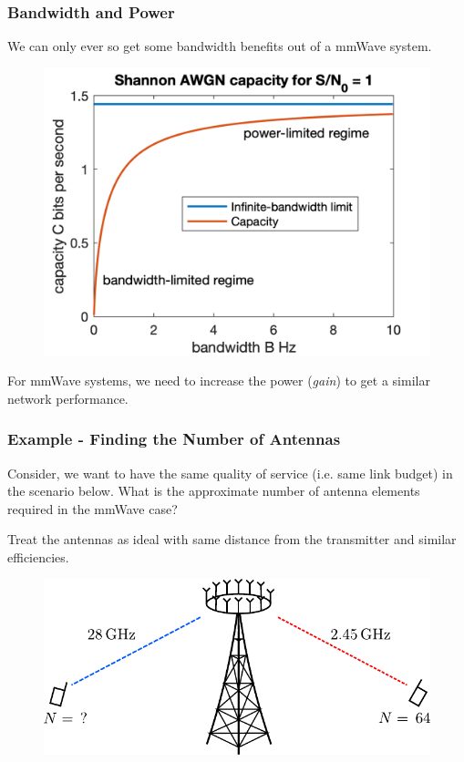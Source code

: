 \documentclass[10pt]{beamer}
\begin{document}
\begin{frame}
    \frametitle{Bandwidth and Power}
    We can only ever so get some bandwidth benefits out of a mmWave system.
    \begin{figure}[htbp]
        \centering
        \includegraphics[width=.75\textwidth]{Channel_Capacity_with_Power-_and_Bandwidth-Limited_Regimes.png}
    \end{figure}
    \begin{tcolorbox}[colback=blue!5]
        For mmWave systems, we need to increase the power (\textit{gain}) to get a similar network performance.
    \end{tcolorbox}
\end{frame}


\begin{frame}
    \frametitle{Example - Finding the Number of Antennas}
    Consider, we want to have the same quality of service (i.e. same link budget) in the scenario below. What is the approximate number of antenna elements required in the mmWave case?

    Treat the antennas as ideal with same distance from the transmitter and similar efficiencies.

    \begin{figure}[h!]
        \centering
        \includegraphics[width=.75\textwidth]{example_antenna.pdf}
    \end{figure}
\end{frame}
\end{document}
